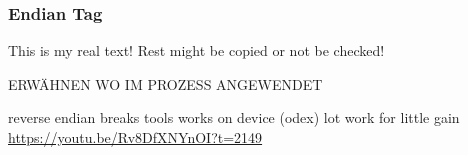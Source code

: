 \subsubsection{Endian Tag} \label{subsubsection:counter-reengineering-break-endian}
This is my real text! Rest might be copied or not be checked!

ERWÄHNEN WO IM PROZESS ANGEWENDET\newline

reverse endian\newline
breaks tools works on device (odex)\newline
lot work for little gain\newline
\url{https://youtu.be/Rv8DfXNYnOI?t=2149}

